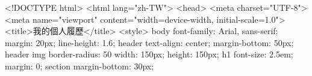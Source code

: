 <!DOCTYPE html>
<html lang="zh-TW">
<head>
    <meta charset="UTF-8">
    <meta name="viewport" content="width=device-width, initial-scale=1.0">
    <title>我的個人履歷</title>
    <style>
        body {
            font-family: Arial, sans-serif;
            margin: 20px;
            line-height: 1.6;
        }
        header {
            text-align: center;
            margin-bottom: 50px;
        }
        header img {
            border-radius: 50%
            width: 150px;
            height: 150px;
        }
        h1 {
            font-size: 2.5em;
            margin: 0;
        }
        section {
            margin-bottom: 30px;
        }
